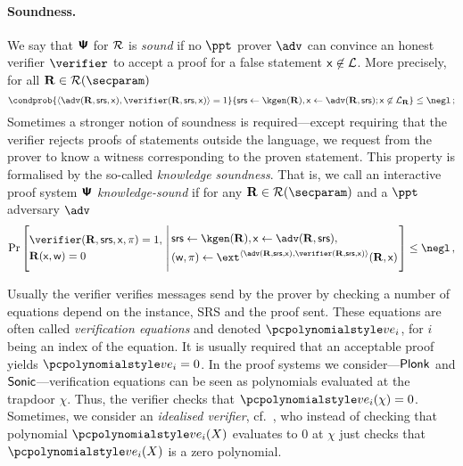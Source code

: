 \documentclass[runningheads,11pt]{llncs}
\theoremstyle{definition} \newtheorem{definition}[theorem]{Definition}
\begin{document}
\paragraph{Soundness.}
    We say that $\bm{\mathsf{\Psi}}$ for $\mathcal{R}$ is \emph{sound} if no
  $\ppt$ prover $\adv$ can convince an honest verifier $\verifier$ to accept a
  proof for a false statement $\mathsf{x} \not\in\mathcal{L}$. More precisely, for
  all $\REL \in \RELGEN(\secparam)$
	\[
      \condprob{\ip{\adv(\REL, \srs, \inp)}{\verifier(\REL, \srs, \inp)} =
        1}{\srs \gets \kgen(\REL), \inp \gets \adv(\REL, \srs); \inp \not\in
        \LANG_\REL} \leq \negl\,;
	\]
Sometimes a stronger notion of soundness is required---except requiring that the
verifier rejects proofs of statements outside the language, we request from the
prover to know a witness corresponding to the proven statement. This property is
formalised by the so-called \emph{knowledge soundness}.
That is, we call an interactive proof system $\bm{\mathsf{\Psi}}$
\emph{knowledge-sound} if for any $\REL \in \RELGEN(\secparam)$ and a $\ppt$
adversary $\adv$
	\[
	\Pr\left[
		\begin{aligned}
			& \verifier(\REL, \srs, \inp, \zkproof) = 1, \\
			& \REL(\inp, \wit) = 0
	 \end{aligned}
	  \,\left|\,
	 \begin{aligned}
		 & \srs \gets \kgen(\REL), \inp \gets \adv(\REL, \srs), \\
		 & (\wit, \zkproof) \gets \ext^{\ip{\adv(\REL, \srs, \inp)}{\verifier(\REL, \srs, \inp)}}(\REL, \inp)
	 \end{aligned}
	 \vphantom{\begin{aligned}
		 \adv (\zkproof) = 1, \\
		 \text{if $\zkproof{}$ is accepting} \\
		 \pcind \text{then $\REL(\inp, \wit)$}
	 \end{aligned}}\right.
	 \right] \leq \negl\,,
 \]

 Usually the verifier verifies messages send by the prover by checking a number
 of equations depend on the instance, SRS and the proof sent. These equations
 are often called \emph{verification equations} and denoted $\vereq_i$, for $i$
 being an index of the equation. It is usually required that an acceptable proof
 yields $\vereq_i = 0$. In the proof systems we consider---$\textnormal{\textsf{Plonk}}$ and
 ${\textnormal{\textsf{Sonic}}}$---verification equations can be seen as polynomials evaluated at the
 trapdoor $\chi$. Thus, the verifier checks that $\vereq_i(\chi) =
 0$. Sometimes, we consider an \emph{idealised verifier},
 cf.~\cite{EPRINT:GabWilCio19}, who instead of checking that polynomial
 $\vereq_i(X)$ evaluates to $0$ at $\chi$ just checks that $\vereq_i(X)$ is a
 zero polynomial.
\end{document}

